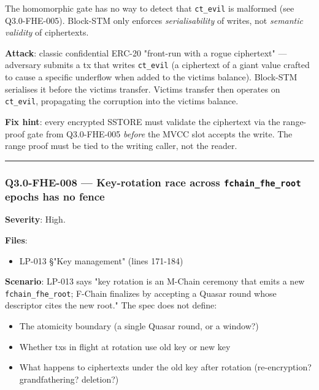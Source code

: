 \documentclass[
]{article}
\providecommand{\tightlist}{%
  \setlength{\itemsep}{0pt}\setlength{\parskip}{0pt}}
\begin{document}
The homomorphic gate has no way to detect that \texttt{ct\_evil} is
malformed (see Q3.0-FHE-005). Block-STM only enforces
\emph{serialisability} of writes, not \emph{semantic validity} of
ciphertexts.

\textbf{Attack}: classic confidential ERC-20 "front-run with a rogue
ciphertext" --- adversary submits a tx that writes \texttt{ct\_evil} (a
ciphertext of a giant value crafted to cause a specific underflow when
added to the victim\textquotesingle s balance). Block-STM serialises it
before the victim\textquotesingle s transfer. Victim\textquotesingle s
transfer then operates on \texttt{ct\_evil}, propagating the corruption
into the victim\textquotesingle s balance.

\textbf{Fix hint}: every encrypted SSTORE must validate the ciphertext
via the range-proof gate from Q3.0-FHE-005 \emph{before} the MVCC slot
accepts the write. The range proof must be tied to the writing caller,
not the reader.

\begin{center}\rule{0.5\linewidth}{0.5pt}\end{center}

\subsubsection{\texorpdfstring{Q3.0-FHE-008 --- Key-rotation race across
\texttt{fchain\_fhe\_root} epochs has no
fence}{Q3.0-FHE-008 --- Key-rotation race across fchain\_fhe\_root epochs has no fence}}\label{q30-fhe-008--key-rotation-race-across-fchain_fhe_root-epochs-has-no-fence}

\textbf{Severity}: High.

\textbf{Files}:

\begin{itemize}
\tightlist
\item
  LP-013 §"Key management" (lines 171-184)
\end{itemize}

\textbf{Scenario}: LP-013 says "key rotation is an M-Chain ceremony that
emits a new \texttt{fchain\_fhe\_root}; F-Chain finalizes by accepting a
Quasar round whose descriptor cites the new root." The spec does not
define:

\begin{itemize}
\tightlist
\item
  The atomicity boundary (a single Quasar round, or a window?)
\item
  Whether txs in flight at rotation use old key or new key
\item
  What happens to ciphertexts under the old key after rotation
  (re-encryption? grandfathering? deletion?)
\end{itemize}
\end{document}
